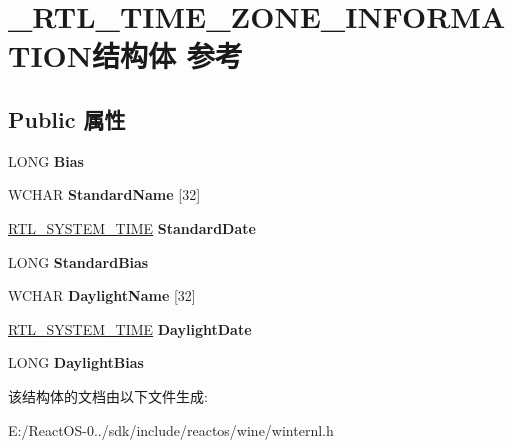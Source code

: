 \hypertarget{struct___r_t_l___t_i_m_e___z_o_n_e___i_n_f_o_r_m_a_t_i_o_n}{}\section{\+\_\+\+R\+T\+L\+\_\+\+T\+I\+M\+E\+\_\+\+Z\+O\+N\+E\+\_\+\+I\+N\+F\+O\+R\+M\+A\+T\+I\+O\+N结构体 参考}
\label{struct___r_t_l___t_i_m_e___z_o_n_e___i_n_f_o_r_m_a_t_i_o_n}
\subsection*{Public 属性}
\begin{DoxyCompactItemize}
\item 
\mbox{\label{struct___r_t_l___t_i_m_e___z_o_n_e___i_n_f_o_r_m_a_t_i_o_n_af6798bff8861046021d93e589f1a62d7}} 
L\+O\+NG {\bfseries Bias}
\item 
\mbox{\label{struct___r_t_l___t_i_m_e___z_o_n_e___i_n_f_o_r_m_a_t_i_o_n_ac4ecc12a25b75876412dd7abcf1c4961}} 
W\+C\+H\+AR {\bfseries Standard\+Name} \mbox{[}32\mbox{]}
\item 
\mbox{\label{struct___r_t_l___t_i_m_e___z_o_n_e___i_n_f_o_r_m_a_t_i_o_n_a161d08fc6d367a7fa7b231754ec2ac09}} 
\hyperlink{struct___r_t_l___s_y_s_t_e_m___t_i_m_e}{R\+T\+L\+\_\+\+S\+Y\+S\+T\+E\+M\+\_\+\+T\+I\+ME} {\bfseries Standard\+Date}
\item 
\mbox{\label{struct___r_t_l___t_i_m_e___z_o_n_e___i_n_f_o_r_m_a_t_i_o_n_a43f06f6fe1dc96bfc7671d2a08f664aa}} 
L\+O\+NG {\bfseries Standard\+Bias}
\item 
\mbox{\label{struct___r_t_l___t_i_m_e___z_o_n_e___i_n_f_o_r_m_a_t_i_o_n_a5b81f9a487a53a64d120e943aad14836}} 
W\+C\+H\+AR {\bfseries Daylight\+Name} \mbox{[}32\mbox{]}
\item 
\mbox{\label{struct___r_t_l___t_i_m_e___z_o_n_e___i_n_f_o_r_m_a_t_i_o_n_aefc91b79230ea4dbe6786fff3625a050}} 
\hyperlink{struct___r_t_l___s_y_s_t_e_m___t_i_m_e}{R\+T\+L\+\_\+\+S\+Y\+S\+T\+E\+M\+\_\+\+T\+I\+ME} {\bfseries Daylight\+Date}
\item 
\mbox{\label{struct___r_t_l___t_i_m_e___z_o_n_e___i_n_f_o_r_m_a_t_i_o_n_a034242bc5f4774cb7bc6eaf038888566}} 
L\+O\+NG {\bfseries Daylight\+Bias}
\end{DoxyCompactItemize}


该结构体的文档由以下文件生成\+:\begin{DoxyCompactItemize}
\item 
E\+:/\+React\+O\+S-\/0../sdk/include/reactos/wine/winternl.\+h\end{DoxyCompactItemize}
